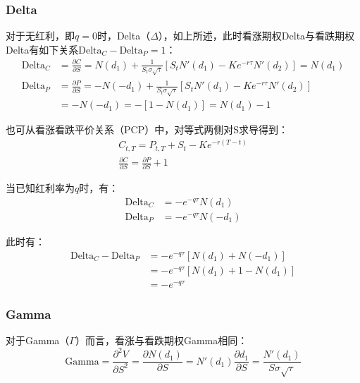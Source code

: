 \documentclass[11pt]{article}
\begin{document}
\subsubsection{Delta}

对于无红利，即$q=0$时，Delta（$\Delta$），如上所述，此时看涨期权Delta与看跌期权Delta有如下关系$\text{Delta}_C - \text{Delta}_P = 1$：
\begin{align*}
    \text{Delta}_C &= \frac{\partial C}{\partial S}
    = N(d_1) + \frac{1}{S_t\sigma\sqrt{\tau}} \left[ S_t N'(d_1)-Ke^{-r\tau}N'(d_2) \right] = N(d_1) \\
    \text{Delta}_P &= \frac{\partial P}{\partial S}
    = -N(-d_1) + \frac{1}{S_t\sigma\sqrt{\tau}} \left[ S_t N'(d_1)-Ke^{-r\tau}N'(d_2) \right] \\
    &= -N(-d_1) = -\left[ 1- N(d_1) \right] = N(d_1)-1
\end{align*}

也可从看涨看跌平价关系（PCP）中，对等式两侧对S求导得到：
\begin{gather*}
    C_{t,T} = P_{t,T} +  S_t - K e^{-r(T-t)} \\
    \frac{\partial C}{\partial S} = \frac{\partial P}{\partial S} + 1
\end{gather*}

当已知红利率为$q$时，有：
\begin{align*}
    \text{Delta}_C &= -e^{-q\tau} N(d_1) \\
    \text{Delta}_P &= -e^{-q\tau} N(-d_1)
\end{align*}

此时有：
\begin{align*}
    \text{Delta}_C - \text{Delta}_P 
    &= -e^{-q\tau} \left[ N(d_1) + N(-d_1) \right] \\
    &= -e^{-q\tau} \left[ N(d_1) + 1 - N(d_1) \right] \\
    &= -e^{-q\tau}
\end{align*}

\subsubsection{Gamma}

对于Gamma（$\Gamma$）而言，看涨与看跌期权Gamma相同：
\begin{equation*}
    \text{Gamma} = \frac{\partial^2 V}{\partial S^2} = \frac{\partial N(d_1)}{\partial S} = N'(d_1)\frac{\partial d_1}{\partial S} = \frac{N'(d_1)}{S\sigma\sqrt{\tau}}
\end{equation*}
\end{document}
